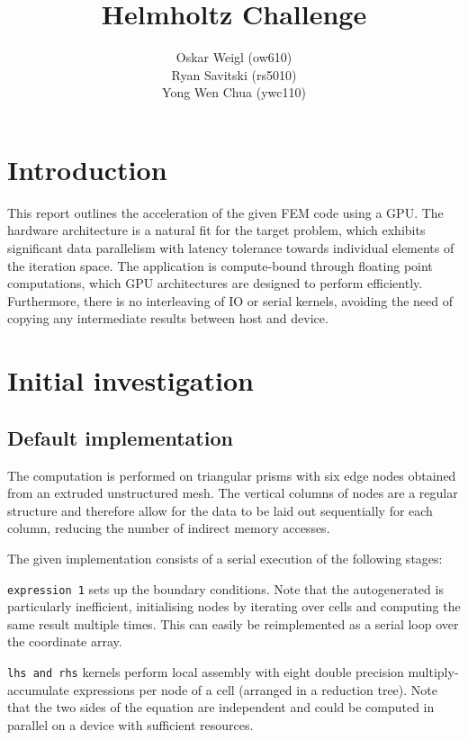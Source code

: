 \documentclass[11pt, oneside, a4paper]{article}
\date{}
\title{Helmholtz Challenge}
\author{
  \small{Oskar Weigl (ow610)}\\
  \small{Ryan Savitski (rs5010)}\\
  \small{Yong Wen Chua (ywc110)}
}
\begin{document}
\maketitle

\section{Introduction} %
\label{sec:introduction}

This report outlines the acceleration of the given FEM code using a GPU. The hardware architecture is a natural fit for the target problem, which exhibits significant data parallelism with latency tolerance towards individual elements of the iteration space. The application is compute-bound through floating point computations, which GPU architectures are designed to perform efficiently. Furthermore, there is no interleaving of IO or serial kernels, avoiding the need of copying any intermediate results between host and device.


\section{Initial investigation} %
\label{sec:initial_investigation}

\subsection{Default implementation} %
\label{sub:default_implementation}

The computation is performed on triangular prisms with six edge nodes obtained from an extruded unstructured mesh. The vertical columns of nodes are a regular structure and therefore allow for the data to be laid out sequentially for each column, reducing the number of indirect memory accesses.

The given implementation consists of a serial execution of the following stages: 

 \texttt{expression 1} sets up the boundary conditions. Note that the autogenerated is particularly inefficient, initialising nodes by iterating over cells and computing the same result multiple times. This can easily be reimplemented as a serial loop over the coordinate array.

\texttt{lhs and rhs} kernels perform local assembly with eight double precision multiply-accumulate expressions per node of a cell (arranged in a reduction tree). Note that the two sides of the equation are independent and could be computed in parallel on a device with sufficient resources.
\end{document}
